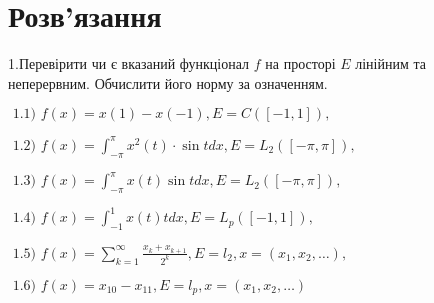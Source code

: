 \section*{Розв'язання}
\begin{tcolorbox}[title=Завдлання 1]
    1.Перевірити чи є вказаний функціонал $f$ на просторі $E$ лінійним та неперервним. 
    Обчислити його норму за означенням.

    $\text { 1.1) } f(x)=x(1)-x(-1), E=C([-1,1]),$ 


    $\text { 1.2) } f(x)=\int_{-\pi}^{\pi} x^{2}(t) \cdot \sin t d x, E=L_{2}([-\pi, \pi]),$


    $\text { 1.3) } f(x)=\int_{-\pi}^{\pi} x(t) \sin t d x, E=L_{2}([-\pi, \pi]),$


    $\text { 1.4) } f(x)=\int_{-1}^{1} x(t) t d x, E=L_{p}([-1,1]),$


    $\text { 1.5) } f(x)=\sum_{k=1}^{\infty} \frac{x_{k}+x_{k+1}}{2^{k}}, E=l_{2}, x=(x_{1}, x_{2}, \ldots),$


    $\text { 1.6) } f(x)=x_{10}-x_{11}, E=l_{p}, x=(x_{1}, x_{2}, \ldots)$


\end{tcolorbox}